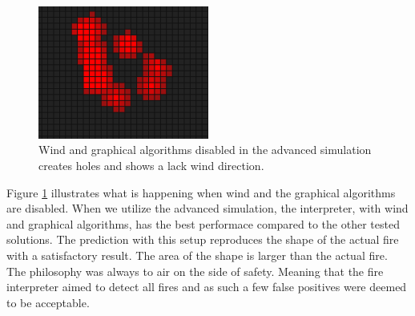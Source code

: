 \begin{figure}[here]
  \centering
      \includegraphics[width=0.5\textwidth]{discussion/graphics/advanced-without-wind-and-bresenham.png}
  \caption{Wind and graphical algorithms disabled in the advanced simulation creates holes and shows a lack wind direction.}
  \label{fig:advanced-without-wind-and-bresenham}
\end{figure}

Figure \ref{fig:advanced-without-wind-and-bresenham} illustrates what is happening when wind and the graphical algorithms are disabled. When we utilize the advanced simulation, the interpreter, with wind and graphical algorithms, has the best performace compared to the other tested solutions. The prediction with this setup reproduces the shape of the actual fire with a satisfactory result. The area of the shape is larger than the actual fire. The philosophy was always to air on the side of safety. Meaning that the fire interpreter aimed to detect all fires and as such a few false positives were deemed to be acceptable.